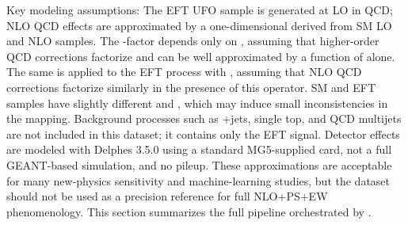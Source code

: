 {}
\markdownRendererSectionEnd \markdownRendererSectionBegin
{}\markdownRendererInterblockSeparator
{}Key modeling assumptions:\markdownRendererInterblockSeparator
{}\markdownRendererUlBeginTight
\markdownRendererUlItem The EFT UFO sample is generated at LO in QCD; NLO QCD effects are approximated by a one-dimensional  derived from SM LO and NLO samples.\markdownRendererUlItemEnd 
\markdownRendererUlItem The -factor depends only on , assuming that higher-order QCD corrections factorize and can be well approximated by a function of  alone.\markdownRendererUlItemEnd 
\markdownRendererUlItem The same  is applied to the EFT process with , assuming that NLO QCD corrections factorize similarly in the presence of this operator.\markdownRendererUlItemEnd 
\markdownRendererUlItem SM and EFT samples have slightly different  and , which may induce small inconsistencies in the mapping.\markdownRendererUlItemEnd 
\markdownRendererUlItem Background processes such as +jets, single top, and QCD multijets are not included in this dataset; it contains only the EFT  signal.\markdownRendererUlItemEnd 
\markdownRendererUlItem Detector effects are modeled with Delphes 3.5.0 using a standard MG5-supplied card, not a full GEANT-based simulation, and no pileup.\markdownRendererUlItemEnd 
\markdownRendererUlEndTight \markdownRendererInterblockSeparator
{}These approximations are acceptable for many new-physics sensitivity and machine-learning studies, but the dataset should not be used as a precision reference for full NLO+PS+EW phenomenology.\markdownRendererInterblockSeparator
{}
\markdownRendererSectionEnd 
\markdownRendererSectionEnd \markdownRendererSectionBegin
{}\markdownRendererInterblockSeparator
{}This section summarizes the full pipeline orchestrated by .\markdownRendererInterblockSeparator
{}\markdownRendererSectionBegin
{}\markdownRendererInterblockSeparator
{}\markdownRendererOlBegin
{}\markdownRendererInterblockSeparator
